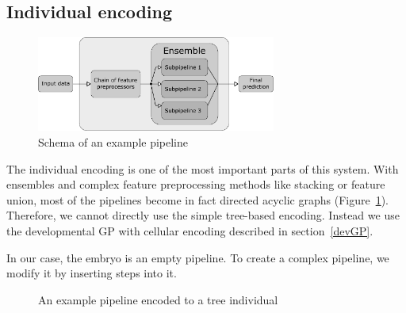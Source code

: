 \subsection{Individual encoding} \label{sec:encoding}
\begin{figure}[ht]\centering
\includegraphics[width=0.7\textwidth]{../img/pipeline-pdfa.pdf}
\caption{Schema of an example pipeline}
\label{pic02:pipeline}
\end{figure}

The individual encoding is one of the most important parts of this system. With
ensembles and complex feature preprocessing methods like stacking or feature
union, most of the pipelines become in fact directed acyclic graphs (Figure~\ref{pic02:pipeline}). Therefore, we cannot directly use the simple tree-based
encoding. Instead we use the developmental GP with cellular encoding described
in section~\ref{devGP}.

In our case, the embryo is an empty pipeline. To create a complex pipeline, we
modify it by inserting steps into it.

\begin{figure}[ht]\centering
    \qquad
    \caption{An example pipeline encoded to a tree individual}%
    \label{pic:pipeencoding}%
\end{figure}

